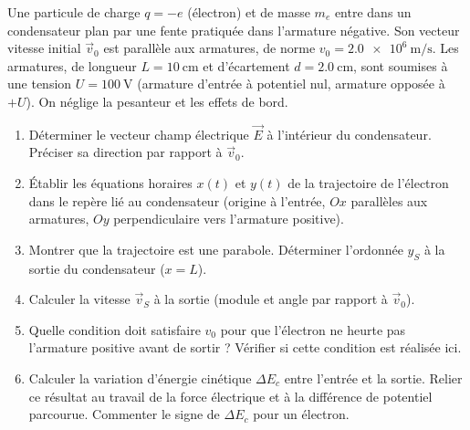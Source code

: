 \documentclass[11pt]{article}
\begin{document}
\begin{exercice}
Une particule de charge $q = -e$ (électron) et de masse $m_e$ entre dans un condensateur plan par une fente pratiquée dans l'armature négative. Son vecteur vitesse initial $\vec{v}_0$ est parallèle aux armatures, de norme $v_0 = \SI{2.0e6}{\meter\per\second}$. Les armatures, de longueur $L = \SI{10}{\centi\meter}$ et d'écartement $d = \SI{2.0}{\centi\meter}$, sont soumises à une tension $U = \SI{100}{\volt}$ (armature d'entrée à potentiel nul, armature opposée à $+U$). On néglige la pesanteur et les effets de bord.
\begin{enumerate}
    \item Déterminer le vecteur champ électrique $\vec{E}$ à l'intérieur du condensateur. Préciser sa direction par rapport à $\vec{v}_0$.
    \item Établir les équations horaires $x(t)$ et $y(t)$ de la trajectoire de l'électron dans le repère lié au condensateur (origine à l'entrée, $Ox$ parallèles aux armatures, $Oy$ perpendiculaire vers l'armature positive).
    \item Montrer que la trajectoire est une parabole. Déterminer l'ordonnée $y_S$ à la sortie du condensateur ($x=L$).
    \item Calculer la vitesse $\vec{v}_S$ à la sortie (module et angle par rapport à $\vec{v}_0$).
    \item Quelle condition doit satisfaire $v_0$ pour que l'électron ne heurte pas l'armature positive avant de sortir ? Vérifier si cette condition est réalisée ici.
    \item Calculer la variation d'énergie cinétique $\Delta E_c$ entre l'entrée et la sortie. Relier ce résultat au travail de la force électrique et à la différence de potentiel parcourue. Commenter le signe de $\Delta E_c$ pour un électron.
\end{enumerate}
\end{exercice}
\end{document}

